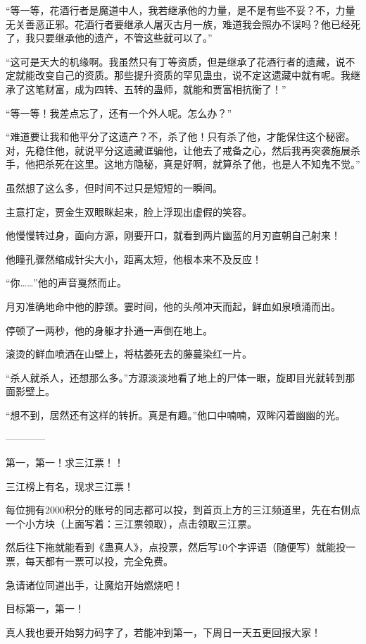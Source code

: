 \begin{this_body}
“等一等，花酒行者是魔道中人，我若继承他的力量，是不是有些不妥？不，力量无关善恶正邪。花酒行者要继承人屠灭古月一族，难道我会照办不误吗？他已经死了，我只要继承他的遗产，不管这些就可以了。”

“这可是天大的机缘啊。我虽然只有丁等资质，但是继承了花酒行者的遗藏，说不定就能改变自己的资质。那些提升资质的罕见蛊虫，说不定这遗藏中就有呢。我继承了这笔财富，成为四转、五转的蛊师，就能和贾富相抗衡了！”

“等一等！我差点忘了，还有一个外人呢。怎么办？”

“难道要让我和他平分了这遗产？不，杀了他！只有杀了他，才能保住这个秘密。对，先稳住他，就说平分这遗藏诓骗他，让他去了戒备之心，然后我再突袭施展杀手，他把杀死在这里。这地方隐秘，真是好啊，就算杀了他，也是人不知鬼不觉。”

虽然想了这么多，但时间不过只是短短的一瞬间。

主意打定，贾金生双眼眯起来，脸上浮现出虚假的笑容。

他慢慢转过身，面向方源，刚要开口，就看到两片幽蓝的月刃直朝自己射来！

他瞳孔骤然缩成针尖大小，距离太短，他根本来不及反应！

“你……”他的声音戛然而止。

月刃准确地命中他的脖颈。霎时间，他的头颅冲天而起，鲜血如泉喷涌而出。

停顿了一两秒，他的身躯才扑通一声倒在地上。

滚烫的鲜血喷洒在山壁上，将枯萎死去的藤蔓染红一片。

“杀人就杀人，还想那么多。”方源淡淡地看了地上的尸体一眼，旋即目光就转到那面影壁上。

“想不到，居然还有这样的转折。真是有趣。”他口中喃喃，双眸闪着幽幽的光。

------------

第一，第一！求三江票！！

三江榜上有名，现求三江票！

每位拥有2000积分的账号的同志都可以投，到首页上方的三江频道里，先在右侧点一个小方块（上面写着：三江票领取），点击领取三江票。

然后往下拖就能看到《蛊真人》，点投票，然后写10个字评语（随便写）就能投一票，每天都有一票可以投，完全免费。

急请诸位同道出手，让魔焰开始燃烧吧！

目标第一，第一！

真人我也要开始努力码字了，若能冲到第一，下周日一天五更回报大家！

\end{this_body}

